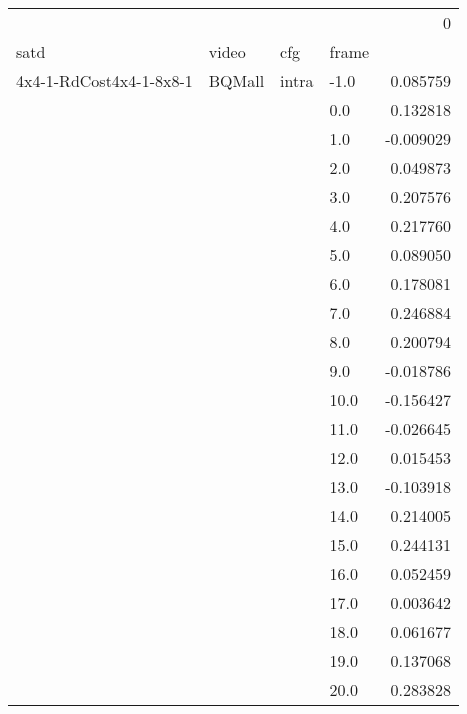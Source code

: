 \begin{tabular}{llllr}
\toprule
                        &        &              &       &         0 \\
satd & video & cfg & frame &           \\
\midrule
4x4-1-RdCost4x4-1-8x8-1 & BQMall & intra & -1.0  &  0.085759 \\
                        &        &              &  0.0  &  0.132818 \\
                        &        &              &  1.0  & -0.009029 \\
                        &        &              &  2.0  &  0.049873 \\
                        &        &              &  3.0  &  0.207576 \\
                        &        &              &  4.0  &  0.217760 \\
                        &        &              &  5.0  &  0.089050 \\
                        &        &              &  6.0  &  0.178081 \\
                        &        &              &  7.0  &  0.246884 \\
                        &        &              &  8.0  &  0.200794 \\
                        &        &              &  9.0  & -0.018786 \\
                        &        &              &  10.0 & -0.156427 \\
                        &        &              &  11.0 & -0.026645 \\
                        &        &              &  12.0 &  0.015453 \\
                        &        &              &  13.0 & -0.103918 \\
                        &        &              &  14.0 &  0.214005 \\
                        &        &              &  15.0 &  0.244131 \\
                        &        &              &  16.0 &  0.052459 \\
                        &        &              &  17.0 &  0.003642 \\
                        &        &              &  18.0 &  0.061677 \\
                        &        &              &  19.0 &  0.137068 \\
                        &        &              &  20.0 &  0.283828 \\

\end{tabular}
